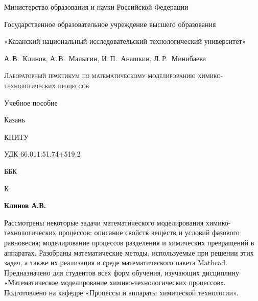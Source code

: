 \begin{center}
	
Министерство образования и науки Российской Федерации

Государственное образовательное учреждение высшего образования

«Казанский национальный исследовательский технологический университет»
\vspace{3 cm}

А.\,В.~Клинов, А.\,В.~Малыгин, И.\,П.~Анашкин, Л.\,Р.~Минибаева
\vspace{3 cm}

\textsc{Лабораторный практикум по математическому моделированию химико-технологических процессов}
\vspace{1 cm}

Учебное пособие
\vspace{4 cm}

Казань

КНИТУ

\number\year
\end{center}
\thispagestyle{empty}
\newpage

УДК 66.011:51.74+519.2

ББК 

К 

\textbf{Клинов А.В.}


Рассмотрены некоторые задачи математического моделирования химико-технологических процессов: описание свойств веществ и условий фазового равновесия; моделирование процессов разделения и химических превращений в аппаратах. Разобраны математические методы, используемые при решении этих задач, а также их реализация в среде математического пакета Mathcad. 
Предназначено для студентов всех форм обучения, изучающих дисциплину «Математическое моделирование химико-технологических процессов».
Подготовлено на кафедре «Процессы и аппараты химической технологии».


\thispagestyle{empty}
\newpage
\tableofcontents
\newpage